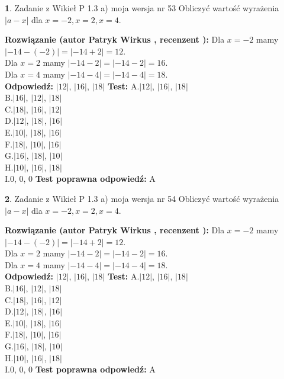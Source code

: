 \documentclass[12pt, a4paper]{article}
\theoremstyle{definition} %
\newtheorem{zad}{}
\newcommand{\zadStart}[1]{\begin{zad}#1\newline}
\newcommand{\zadStop}{\end{zad}}
\newcommand{\rozwStart}[2]{\noindent \textbf{Rozwiązanie (autor #1 , recenzent #2): }\newline}
\newcommand{\rozwStop}{\newline}
\newcommand{\odpStart}{\noindent \textbf{Odpowiedź:}\newline}
\newcommand{\odpStop}{\newline}
\newcommand{\testStart}{\noindent \textbf{Test:}\newline}
\newcommand{\testStop}{\newline}
\newcommand{\kluczStart}{\noindent \textbf{Test poprawna odpowiedź:}\newline}
\newcommand{\kluczStop}{\newline}
\begin{document}
\zadStart{Zadanie z Wikieł P 1.3 a) moja wersja nr 53}
Obliczyć wartość wyrażenia $|a - x|$ dla $x=-2,x=2,x=4$.
\zadStop
\rozwStart{Patryk Wirkus}{}
Dla $x = -2$ mamy $|-14 - (-2)| = |-14 + 2| = 12$.\\
Dla $x = 2$ mamy $|-14 - 2| = |-14 - 2| = 16$.\\
Dla $x = 4$ mamy $|-14 - 4| = |-14 - 4| = 18$.\\
\rozwStop
\odpStart
$|12|$, $|16|$, $|18|$
\odpStop
\testStart
A.$|12|$, $|16|$, $|18|$\\
B.$|16|$, $|12|$, $|18|$\\
C.$|18|$, $|16|$, $|12|$\\
D.$|12|$, $|18|$, $|16|$\\
E.$|10|$, $|18|$, $|16|$\\
F.$|18|$, $|10|$, $|16|$\\
G.$|16|$, $|18|$, $|10|$\\
H.$|10|$, $|16|$, $|18|$\\
I.$0$, $0$, $0$
\testStop
\kluczStart
A
\kluczStop



\zadStart{Zadanie z Wikieł P 1.3 a) moja wersja nr 54}
Obliczyć wartość wyrażenia $|a - x|$ dla $x=-2,x=2,x=4$.
\zadStop
\rozwStart{Patryk Wirkus}{}
Dla $x = -2$ mamy $|-14 - (-2)| = |-14 + 2| = 12$.\\
Dla $x = 2$ mamy $|-14 - 2| = |-14 - 2| = 16$.\\
Dla $x = 4$ mamy $|-14 - 4| = |-14 - 4| = 18$.\\
\rozwStop
\odpStart
$|12|$, $|16|$, $|18|$
\odpStop
\testStart
A.$|12|$, $|16|$, $|18|$\\
B.$|16|$, $|12|$, $|18|$\\
C.$|18|$, $|16|$, $|12|$\\
D.$|12|$, $|18|$, $|16|$\\
E.$|10|$, $|18|$, $|16|$\\
F.$|18|$, $|10|$, $|16|$\\
G.$|16|$, $|18|$, $|10|$\\
H.$|10|$, $|16|$, $|18|$\\
I.$0$, $0$, $0$
\testStop
\kluczStart
A
\kluczStop
\end{document}
